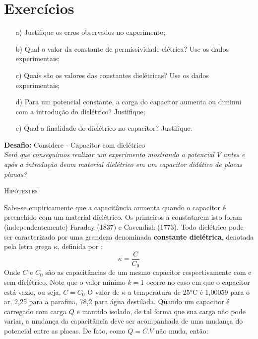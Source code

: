 \section{Exercícios}

\begin{itemize}
	\item[a)] Justifique os erros observados no experimento;
	
	\item[b)] Qual o valor da constante de permissividade elétrica? Use os dados experimentais;

	\item[c)] Quais são os valores das constantes dielétricas? Use os dados experimentais;
	
	\item[d)] Para um potencial constante, a carga do capacitor aumenta ou diminui com a introdução do dielétrico? Justifique;
	
	\item[e)] Qual a finalidade do dielétrico no capacitor? Justifique.
	
\end{itemize}

\noindent{\color{red} \rule{\linewidth}{0.5mm} }\textbf{Desafio:}
Considere - Capacitor com dielétrico
\\
\textit{Será que conseguimos realizar um experimento mostrando o potencial $V$ antes e após a introdução deum material dielétrico em um capacitor didático de placas planas?}

\noindent
\textsc{Hipótestes}

Sabe-se empiricamente que a capacitância aumenta quando o capacitor é preenchido com um material dielétrico. Os primeiros a constatarem isto foram (independentemente) Faraday (1837) e Cavendish (1773). Todo dielétrico pode ser caracterizado por uma grandeza denominada \textbf{constante dielétrica}, denotada pela letra grega $\kappa$, definida por :
 $$\kappa = \frac{C}{C_0}$$
Onde $C$ e ${C_0}$ são as capacitâncias de um mesmo capacitor respectivamente com e sem dielétrico. Note que o valor mínimo $k = 1$ ocorre no caso em que o capacitor está vazio, ou seja, $ C = C_0$ O valor de $\kappa$ a temperatura de 25°C é 1,00059 para o ar, 2,25 para a parafina, 78,2 para água destilada. 
Quando um capacitor é carregado com carga $Q$ e mantido isolado, de tal forma que sua carga não pode variar, a mudança da capacitância deve ser acompanhada de uma mudança do potencial entre as placas. De fato, como $Q=C.V$ não muda, então:

